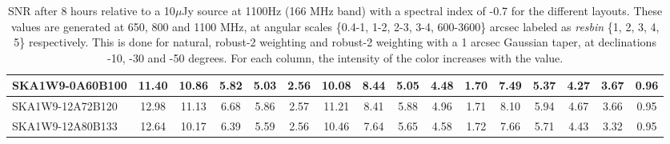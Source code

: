 \begin{table}[H]
{{\begin{tabular}{|lccccc||ccccc||ccccc|}
SKA1W9-0A60B100 & 11.40 \cellcolor{blue!41.62} & 10.86 \cellcolor{red!45.94} & 5.82 \cellcolor{green!18.00} & 5.03 \cellcolor{orange!18.00} & 2.56 \cellcolor{purple!25.64} & 10.08 \cellcolor{blue!42.27} & 8.44 \cellcolor{red!36.76} & 5.05 \cellcolor{green!18.00} & 4.48 \cellcolor{orange!18.00} & 1.70 \cellcolor{purple!22.20} & 7.49 \cellcolor{blue!32.09} & 5.37 \cellcolor{red!19.35} & 4.27 \cellcolor{green!18.00} & 3.67 \cellcolor{orange!29.40} & 0.96 \cellcolor{purple!26.40}\\ \hline 
SKA1W9-12A72B120 & 12.98 \cellcolor{blue!60.00} & 11.13 \cellcolor{red!48.34} & 6.68 \cellcolor{green!41.45} & 5.86 \cellcolor{orange!47.29} & 2.57 \cellcolor{purple!29.45} & 11.21 \cellcolor{blue!56.48} & 8.41 \cellcolor{red!36.45} & 5.88 \cellcolor{green!46.81} & 4.96 \cellcolor{orange!36.84} & 1.71 \cellcolor{purple!26.40} & 8.10 \cellcolor{blue!40.60} & 5.94 \cellcolor{red!32.15} & 4.67 \cellcolor{green!37.09} & 3.66 \cellcolor{orange!29.07} & 0.95 \cellcolor{purple!18.00}\\ \hline 
SKA1W9-12A80B133 & 12.64 \cellcolor{blue!56.04} & 10.17 \cellcolor{red!39.80} & 6.39 \cellcolor{green!33.55} & 5.59 \cellcolor{orange!37.76} & 2.56 \cellcolor{purple!25.64} & 10.46 \cellcolor{blue!47.05} & 7.64 \cellcolor{red!28.60} & 5.65 \cellcolor{green!38.83} & 4.58 \cellcolor{orange!21.93} & 1.72 \cellcolor{purple!30.60} & 7.66 \cellcolor{blue!34.47} & 5.71 \cellcolor{red!26.98} & 4.43 \cellcolor{green!25.64} & 3.32 \cellcolor{orange!18.00} & 0.95 \cellcolor{purple!18.00}\\ \hline 
\end{tabular}}
\vspace{-0.300000cm}
\hspace{1cm} 

\vspace{.25cm}
\caption{SNR after 8 hours relative to a 10$\mu$Jy source at 1100Hz (166 MHz band) with a spectral index of -0.7 for the different layouts. These values are generated at 650, 800 and 1100 MHz, at angular scales \{0.4-1, 1-2, 2-3, 3-4, 600-3600\} arcsec labeled as {\it resbin} \{1, 2, 3, 4, 5\} respectively. This is done for natural, robust-2 weighting and robust-2 weighting with a 1 arcsec Gaussian taper, at declinations -10, -30 and -50 degrees. For each column, the intensity of the color increases with the value.}\label{tab:snr10}}
 \end{table}
